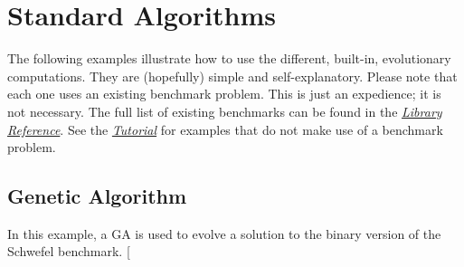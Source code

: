 \documentclass[letterpaper,10pt,english]{sphinxmanual}
\begin{document}
\section{Standard Algorithms}
\label{examples:standard-algorithms}
The following examples illustrate how to use the different, built-in, evolutionary computations.
They are (hopefully) simple and self-explanatory. Please note that each one uses an existing
benchmark problem. This is just an expedience; it is not necessary. The full list of existing
benchmarks can be found in the {\hyperref[reference::doc]{\emph{Library Reference}}}. See the {\hyperref[tutorial::doc]{\emph{Tutorial}}} for examples that
do not make use of a benchmark problem.


\subsection{Genetic Algorithm}
\label{examples:genetic-algorithm}
In this example, a GA is used to evolve a solution to the binary version of the Schwefel benchmark.
{[}\code{download}{]}
\end{document}
